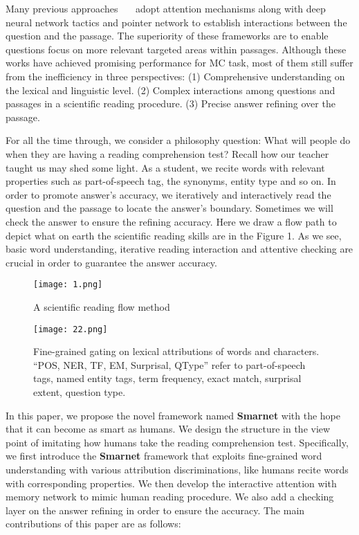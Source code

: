 \documentclass[letterpaper]{article} %
\begin{document}
Many previous approaches~\cite{seo2016bidirectional}~\cite{Gong2017Ruminating}~\cite{Wang2017GatedSN} adopt attention mechanisms along with deep neural network tactics and pointer network to establish interactions between the question and the passage. The superiority of these frameworks are to enable questions focus on more relevant targeted areas within passages. Although these works have achieved promising performance for MC task, most of them still suffer from the inefficiency in three perspectives: (1) Comprehensive understanding on the lexical and linguistic level. (2) Complex interactions among questions and passages in a scientific reading procedure. (3) Precise answer refining over the passage.

For all the time through, we consider a philosophy question: What will people do when they are having a reading comprehension test? Recall how our teacher taught us may shed some light. As a student, we recite words with relevant properties such as part-of-speech tag, the synonyms, entity type and so on. In order to promote answer's accuracy, we iteratively and interactively read the question and the passage to locate the answer's boundary. Sometimes we will check the answer to ensure the refining accuracy. Here we draw a flow path to depict what on earth the scientific reading skills are in the Figure 1. As we see, basic word understanding, iterative reading interaction and attentive checking are crucial in order to guarantee the answer accuracy.
\begin{figure}[t]
	\centering
	\texttt{[image: 1.png]}
	\caption{A scientific reading flow method}
\end{figure}
 \begin{figure*}[t]
	\centering
	\texttt{[image: 22.png]}
	\caption{Fine-grained gating on lexical attributions of words and characters. ``POS, NER, TF, EM, Surprisal, QType'' refer to part-of-speech tags, named entity tags, term frequency, exact match, surprisal extent, question type.}
\end{figure*}

In this paper, we propose the novel framework named \textbf{Smarnet} with the hope that it can become as smart as humans. We design the structure in the view point of imitating how humans take the reading comprehension test. Specifically, we first introduce the \textbf{Smarnet} framework that exploits fine-grained word understanding with various attribution discriminations, like humans recite words with corresponding properties. We then develop the interactive attention with memory network to mimic human reading procedure. We also add a checking layer on the answer refining in order to ensure the accuracy. The main contributions of this paper are as follows:
\end{document}
